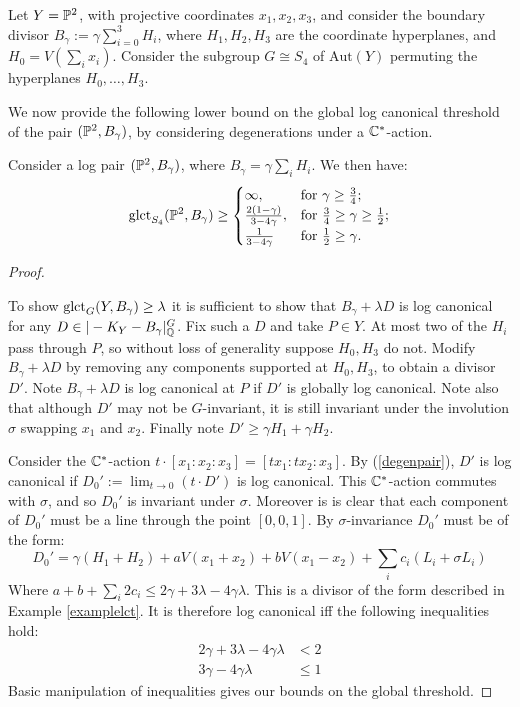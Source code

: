 Let \(Y = \mathbb{P}^2\), with projective coordinates \(x_1,x_2,x_3\), and consider the boundary divisor \(B_\gamma  := \gamma \sum_{i=0}^3  H_i\), where \(H_1,H_2,H_3\) are the coordinate hyperplanes, and \(H_0 = V (\sum_i x_i) \). Consider the subgroup \(G \cong S_4\) of \(\text{Aut}(Y)\) permuting the hyperplanes \(H_0,\dots,H_3\).

We now provide the following lower bound on the global log canonical threshold of the pair \((\mathbb{P}^2,B_\gamma)\), by considering degenerations under a \(\mathbb{C}^*\)-action. 
\begin{lemma}\label{lem:alph}
Consider a log pair \((\mathbb{P}^2,B_\gamma)\), where \(B_\gamma = \gamma \sum_i H_i\). We then have:
\[
\operatorname{glct}_{S_4}(\mathbb{P}^2, B_\gamma) \ge
\begin{cases}
\infty, & \text{for } \gamma \ge \frac{3}{4};\\
\frac{2(1-\gamma)}{3-4\gamma}, & \text{for } \frac{3}{4} \ge \gamma \ge \frac{1}{2};\\
\frac{1}{3-4 \gamma} & \text{for } \frac{1}{2} \ge \gamma.
\end{cases}
\]
\end{lemma}
\begin{proof} \

To show \(\operatorname{glct}_{G}(Y,B_\gamma) \ge \lambda\) it is sufficient to show that \(B_\gamma+\lambda D\) is log canonical for any \( D \in |-K_Y - B_\gamma|_{\mathbb{Q}}^G\). Fix such a \(D\) and take \(P \in Y\). At most two of the \(H_i\) pass through \(P\), so without loss of generality suppose \(H_0,H_3\) do not. Modify \(B_\gamma+\lambda D\) by removing any components supported at \(H_0,H_3\), to obtain a divisor \(D'\). Note \(B_\gamma+\lambda D\) is log canonical at \(P\) if \(D'\) is globally log canonical. Note also that although \(D'\) may not be \(G\)-invariant, it is still invariant under the involution \(\sigma \) swapping \(x_1\) and \(x_2\). Finally note \(D' \ge \gamma H_1 + \gamma H_2\).

Consider the \(\mathbb{C}^*\)-action \(t \cdot [x_1:x_2:x_3] = [ t x_1: t x_2 : x_3]\). By (\ref{degenpair}), \(D'\) is log canonical if \(D_0' := \lim_{t \to 0} \left( t \cdot D' \right) \) is log canonical. This \(\mathbb{C}^*\)-action commutes with \(\sigma \), and so \(D_0'\) is invariant under \(\sigma\). Moreover is is clear that each component of \(D_0'\) must be a line through the point \([0,0,1]\). By \(\sigma\)-invariance \(D_0'\) must be of the form:
\[
D_0' = \gamma (H_1+H_2) + a V (x_1+x_2) + b V(x_1-x_2) + \sum_i c_i (L_i + \sigma L_i)
\]
Where \(a + b + \sum_i 2 c_i \le 2 \gamma + 3\lambda - 4 \gamma \lambda\). This is a divisor of the form described in Example \ref{examplelct}. It is therefore log canonical iff the following inequalities hold:
\begin{align*}
2\gamma + 3 \lambda - 4\gamma \lambda &< 2 \\
3\gamma - 4\gamma \lambda &\le 1
\end{align*}
Basic manipulation of inequalities gives our bounds on the global threshold.
\end{proof}
